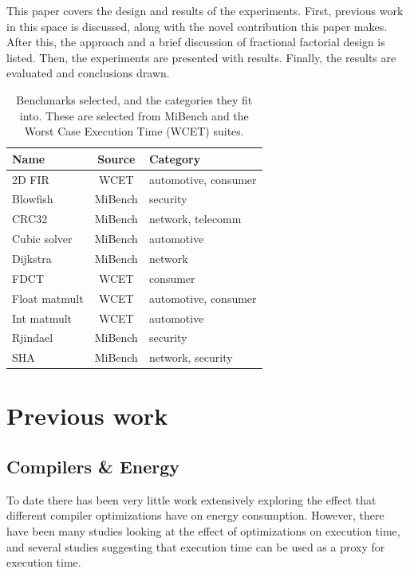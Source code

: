 \documentclass[twocolumn]{article}
\let\oldcaption\caption
\renewcommand{\caption}[1]{\oldcaption{\textup{#1}}}
\begin{document}
This paper covers the design and results of the experiments. First, previous work in this space is discussed, along with the novel contribution this paper makes. After this, the approach and a brief discussion of fractional factorial design is listed. Then, the experiments are presented with results. Finally, the results are evaluated and conclusions drawn.


\begin{table}[t]
	\centering
	\begin{tabular}{l c l}
	\textbf{Name}			& \textbf{Source} 	& \textbf{Category} \\
	\hline
	2D FIR					& WCET 		& automotive, consumer	\\
	Blowfish				& MiBench 	& security	\\
	CRC32					& MiBench 	& network, telecomm	\\
	Cubic solver			& MiBench 	& automotive	\\
	Dijkstra				& MiBench 	& network	\\
	FDCT					& WCET 		& consumer	\\
	Float matmult			& WCET 		& automotive, consumer	\\
	Int matmult				& WCET	 	& automotive	\\
	Rjindael				& MiBench 	& security	\\
	SHA						& MiBench 	& network, security	\\
	\end{tabular}
\caption{Benchmarks selected, and the categories they fit into. These are selected from MiBench\cite{MiBench} and the Worst Case Execution Time (WCET)\cite{WCET} suites.}
\label{Table:Benchmarks}
\end{table}

\section{Previous work}

\subsection{Compilers \& Energy}

To date there has been very little work extensively exploring the effect that different compiler optimizations have on energy consumption. However, there have been many studies looking at the effect of optimizations on execution time\cite{Haneda2005}, and several studies suggesting that execution time can be used as a proxy for execution time\cite{CompilingForPerformancePower}.
\end{document}
